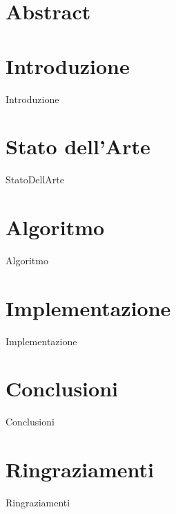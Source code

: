 \documentclass[12pt,oneside]{report}
\begin{document}
 
	                
	\begin{titlepage}
		
	\end{titlepage} 
    
    
	\chapter*{Abstract}
	
    \tableofcontents{}
    \listoftables
    \listoflistings
    \newpage
    \chapter{Introduzione}
    {Introduzione}
    \chapter{Stato dell'Arte}
    {StatoDellArte}
    \chapter{Algoritmo}
    {Algoritmo}
    \chapter{Implementazione}
    {Implementazione}
    \chapter{Conclusioni}
    {Conclusioni}
    \chapter{Ringraziamenti}
    {Ringraziamenti}
    
 
     
    
\end{document}
